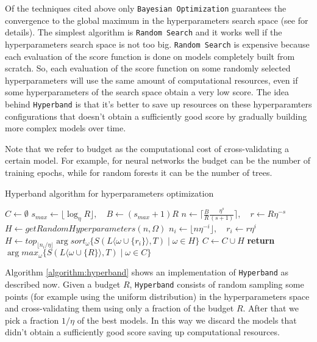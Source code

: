 \documentclass[11pt, a4paper]{article}
\begin{document}
  Of the techniques cited above only \texttt{Bayesian Optimization} guarantees the convergence to the global maximum in the hyperparameters search space (see \cite{bayesianoptimization} for details).
  The simplest algorithm is \texttt{Random Search} and it works well if the hyperparameters search space is not too big.
  \texttt{Random Search} is expensive because each evaluation of the score function is done on models completely built from scratch.
  So, each evaluation of the score function on some randomly selected hyperparameters will use the same amount of computational resources, even if some hyperparameters of the search space obtain a very low score.
  The idea behind \texttt{Hyperband} is that it's better to save up resources on these hyperparamters configurations that doesn't obtain a sufficiently good score by gradually building more complex models over time.
  
  Note that we refer to budget as the computational cost of cross-validating a certain model.
  For example, for neural networks the budget can be the number of training epochs, while for random forests it can be the number of trees.

  \begin{algorithm}
    \caption{Hyperband algorithm for hyperparameters optimization}
    \label{algorithm:hyperband}
    \begin{algorithmic}[1]
        \State $C \gets \emptyset$
        \State $s_{max} \gets \lfloor \log_{\eta}{R} \rfloor, \quad B \gets (s_{max} + 1)R$
          \State $n \gets \lceil \frac{B}{R}\frac{\eta^{s}}{(s+1)} \rceil, \quad r \gets R\eta^{-s}$
          \State $H \gets getRandomHyperparameters(n,\Omega)$
            \State $n_{i} \gets \lfloor n\eta^{-i} \rfloor, \quad r_{i} \gets r\eta^{i}$
            \State $H \gets top_{\lfloor n_{i}/\eta \rfloor} \arg sort_{\omega} \{S(L\langle\omega \cup \{r_{i}\}\rangle, T) \mid \omega \in H\}$
          \EndFor
          \State $C \gets C \cup H$
        \EndFor
        \State \textbf{return} $\arg max_{\omega} \{S(L\langle\omega \cup \{R\}\rangle, T) \mid \omega \in C\}$
      \EndProcedure
    \end{algorithmic}
  \end{algorithm}

  Algorithm \ref{algorithm:hyperband} shows an implementation of \texttt{Hyperband} as described now.
  Given a budget $R$, \texttt{Hyperband} consists of random sampling some points (for example using the uniform distribution) in the hyperparameters space and cross-validating them using only a fraction of the budget $R$.
  After that we pick a fraction $1/\eta$ of the best models.
  In this way we discard the models that didn't obtain a sufficiently good score saving up computational resources.
\end{document}

